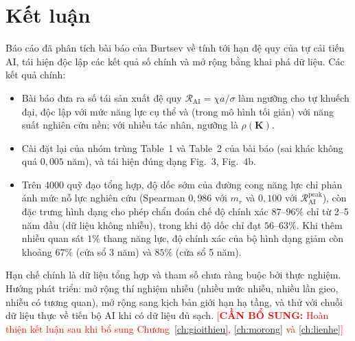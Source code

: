 \documentclass[12pt,a4paper,openany]{report}
\numberwithin{equation}{chapter}   %
\theoremstyle{definition}
\newif\ifdraft \drafttrue          %
\newcommand{\todo}[1]{\ifdraft\textcolor{red}{[\textbf{CẦN BỔ SUNG:} #1]}\fi}
\newcommand{\RAI}{\mathcal{R}_{\mathrm{AI}}}
\begin{document}
\chapter*{Kết luận}
Báo cáo đã phân tích bài báo của Burtsev về tính tới hạn đệ quy của tự cải tiến AI, tái hiện độc lập các kết quả số chính và mở rộng bằng khai phá dữ liệu. Các kết quả chính:
\begin{itemize}
  \item Bài báo đưa ra số tái sản xuất đệ quy $\RAI=\chi a/\sigma$ làm ngưỡng cho tự khuếch đại, độc lập với mức năng lực cụ thể và (trong mô hình tối giản) với năng suất nghiên cứu nền; với nhiều tác nhân, ngưỡng là $\rho(\mathbf{K})$.
  \item Cài đặt lại của nhóm trùng Table~1 và Table~2 của bài báo (sai khác không quá $0{,}005$ năm), và tái hiện đúng dạng Fig.~3, Fig.~4b.
  \item Trên 4000 quỹ đạo tổng hợp, độ dốc sớm của đường cong năng lực chỉ phản ánh mức nỗ lực nghiên cứu (Spearman $0{,}986$ với $m_r$ và $0{,}100$ với $\RAI^{\mathrm{peak}}$), còn đặc trưng hình dạng cho phép chẩn đoán chế độ chính xác $87$--$96\%$ chỉ từ 2--5 năm đầu (dữ liệu không nhiễu), trong khi độ dốc chỉ đạt $56$--$63\%$. Khi thêm nhiễu quan sát $1\%$ thang năng lực, độ chính xác của bộ hình dạng giảm còn khoảng $67\%$ (cửa sổ 3 năm) và $85\%$ (cửa sổ 5 năm).
\end{itemize}
Hạn chế chính là dữ liệu tổng hợp và tham số chưa ràng buộc bởi thực nghiệm. Hướng phát triển: mở rộng thí nghiệm nhiễu (nhiều mức nhiễu, nhiều lần gieo, nhiễu có tương quan), mở rộng sang kịch bản giới hạn hạ tầng, và thử với chuỗi dữ liệu thực về tiến bộ AI khi có dữ liệu đủ sạch.
\todo{Hoàn thiện kết luận sau khi bổ sung Chương~\ref{ch:gioithieu}, \ref{ch:morong} và \ref{ch:lienhe}}

\appendix
\end{document}

